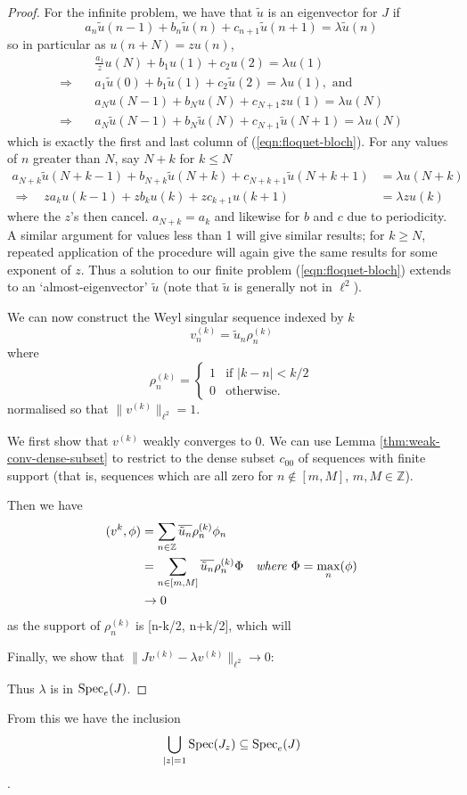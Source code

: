 \documentclass[../main.tex]{subfiles}
\begin{document}
\begin{proof}
For the infinite problem, we have that $\tilde{u}$ is an eigenvector for $J$ if
$$a_n \tilde{u}(n-1) + b_n \tilde{u}(n) + c_{n+1} \tilde{u}(n+1) = \lambda \tilde{u}(n)$$
so in particular as $u(n + N) = z u(n)$,
\begin{align*}
& \frac{a_1}{z} u(N) + b_1 u(1) + c_2 u(2) = \lambda u(1)\\
\Rightarrow \quad& a_1 \tilde{u}(0) + b_1 \tilde{u}(1) + c_2 \tilde{u}(2) = \lambda u(1), \text{ and } \\
& a_N u(N-1) + b_N u(N) + c_{N+1} z u(1) = \lambda u(N)\\
\Rightarrow \quad& a_N \tilde{u}(N-1) + b_N \tilde{u}(N) + c_{N+1} \tilde{u}(N+1) = \lambda u(N)
\end{align*}
which is exactly the first and last column of (\ref{eqn:floquet-bloch}). For any values of $n$ greater than $N$, say $N + k$ for $k \leq N$
\begin{align*}
a_{N+k} \tilde{u}(N+k-1) + b_{N+k} \tilde{u}(N+k) + c_{N+k+1} \tilde{u}(N+k+1) & = \lambda u(N+k) \\
\Rightarrow \quad z a_{k} u(k-1) + z b_{k} u(k) + z c_{k+1} u(k+1) & = \lambda z u(k)
 \end{align*}
where the $z$'s then cancel. $a_{N+k} = a_{k}$ and likewise for $b$ and $c$ due to periodicity. A similar argument for values less than 1 will give similar results; for $k \geq N$, repeated application of the procedure will again give the same results for some exponent of $z$. Thus a solution to our finite problem (\ref{eqn:floquet-bloch}) extends to an `almost-eigenvector' $\tilde{u}$ (note that $\tilde{u}$ is generally not in $\ell^2$).

We can now construct the Weyl singular sequence indexed by $k$
$$v_n^{(k)} = \tilde{u}_n \rho_n^{(k)}$$
where 
$$
\rho_n^{(k)} =
\begin{cases}
1 & \text{if } |k-n| < k/2 \\
0 & \text{otherwise.}
\end{cases}
$$
normalised so that $\|v^{(k)}\|_{\ell^2} = 1$. 

We first show that $v^{(k)}$ weakly converges to 0. We can use Lemma \ref{thm:weak-conv-dense-subset} to restrict to the dense subset $c_{00}$ of sequences with finite support (that is, sequences which are all zero for $n \notin [m, M]$, $m, M \in \mathbb{Z}$).

Then we have
\begin{align*}
(v^{k}, \phi) & =  \sum_{n \in \mathbb{Z}} \overline{\tilde{u}_n} \rho_n^{(k)} \phi_n & \\
& = \sum_{n \in [m, M]} \overline{\tilde{u}_n} \rho_n^{(k)} \Phi & \text{\emph{where $\Phi = \max_{n}(\phi)$}} \\
& \rightarrow 0 &
\end{align*}
as the support of $\rho_n^{(k)}$ is [n-k/2, n+k/2], which will 

Finally, we show that $\|Jv^{(k)} - \lambda v^{(k)}\|_{\ell^2} \rightarrow 0$:

Thus $\lambda$ is in $\mathrm{Spec}_e(J)$.
\end{proof}
From this we have the inclusion
$$\bigcup_{|z|=1} \mathrm{Spec}(J_z) \subseteq \mathrm{Spec}_e(J)$$.
\end{document}

